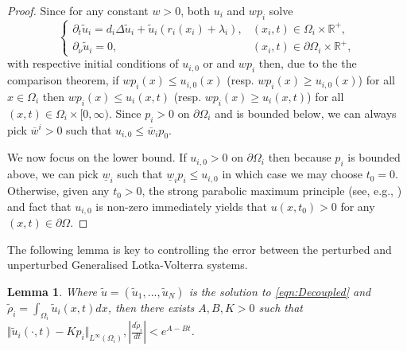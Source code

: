 \documentclass{article}
\newtheorem{lemma}{Lemma}[section]
\begin{document}
\begin{proof}
Since for any constant $w>0$, both $u_i$ and $wp_i$ solve
    \begin{equation}
      \begin{cases}
          \partial_{t}\tilde{u}_i=d_i\Delta{\tilde{u}}_i+\tilde{u}_i\left(r_i(x_i)+\lambda_i\right),&(x_i,t)\in\Omega_i\times\mathbb{R}^{+},
    \\
    
    \partial_{\nu}\tilde{u}_i=0,&(x_i,t)\in\partial{\Omega_i}\times\mathbb{R}^{+},
      \end{cases}
  \end{equation}
  with respective initial conditions of $u_{i,0}$ or and $wp_i$ then, due to the the comparison theorem, if  $wp_i(x)\leq{}u_{i,0}(x)$ (resp. $wp_i(x)\geq{}u_{i,0}(x)$) for all $x\in\Omega_i$ then $wp_i(x)\leq{}u_i(x,t)$ (resp.  $wp_i(x)\geq{}u_i(x,t)$)  for all $(x,t)\in\Omega_i\times[0,\infty)$. Since $p_i>0$ on $\partial\Omega_i$ and is bounded below, we can always pick $\overline{w}^i>0$ such that $u_{i,0}\leq{}\overline{w}_ip_0$. 

  We now focus on the lower bound. If $u_{i,0}>0$ on $\partial\Omega_i$ then because $p_i$ is bounded above, we can pick $\underline{w}_i$ such that $\underline{w}_ip_i\leq{}u_{i,0}$ in which case we may choose $t_0=0$. Otherwise, given any $t_0>0$, the strong parabolic maximum principle (see, e.g., \cite[Theorem 1.1.9]{lam2022introduction}) and fact that $u_{i,0}$ is non-zero  immediately yields that $u(x,t_0)>0$ for any $(x,t)\in\partial\Omega$.

  
\end{proof}

The following lemma is key to controlling the error between the perturbed and unperturbed Generalised Lotka-Volterra systems. 

\begin{lemma}\label{lma:AlphaExpDecay}
    Where $\tilde{u}=(\tilde{u}_1,...,\tilde{u}_N)$ is the solution to \eqref{eqn:Decoupled} and $\tilde{\rho}_i=\int_{\Omega_i}\tilde{u}_i(x,t)dx$, then there exists $A,B,K>0$ such that $\Vert{}\tilde{u}_i(\cdot,t)-Kp_i\Vert_{L^\infty(\Omega_i)},\left|\frac{d\tilde{\rho}_i}{dt}\right|<e^{A-Bt}$.
\end{lemma}
\end{document}
